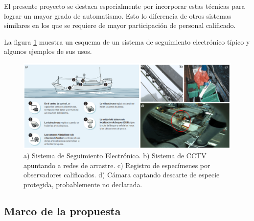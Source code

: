 \documentclass[11pt]{charter}
\begin{document}
El presente proyecto se destaca especialmente por incorporar estas técnicas para lograr un mayor grado de automatismo. Esto lo diferencia de otros sistemas similares en los que se requiere de mayor participación de personal calificado.

La figura \ref{fig:seguimiento_electronico} muestra un esquema de un sistema de seguimiento electrónico típico y algunos ejemplos de sus usos.

\vspace{25px}

\begin{figure}[htpb]
\centering 
\includegraphics[width=.7\textwidth]{./Figuras/seguimiento_electronico.png}
\caption{ a) Sistema de Seguimiento Electrónico. b) Sistema de CCTV apuntando a redes de arrastre. c) Registro de especímenes por observadores calificados. d) Cámara captando descarte de especie protegida, probablemente no declarada.}
\label{fig:seguimiento_electronico}
\end{figure}

\vspace{25px}

\subsection{Marco de la propuesta}
\end{document}
